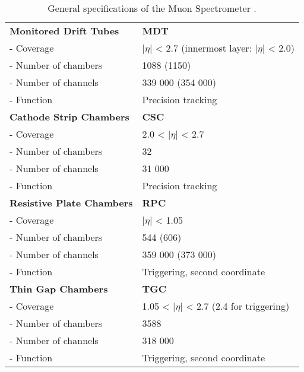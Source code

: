 \begin{table}[] \centering
\caption{General specifications of the Muon Spectrometer \cite{atlas_tdr}.}
\label{tab:muon_specs}
\begin{tabular}{|l|l|}
\hline
\textbf{Monitored Drift Tubes}    & \textbf{MDT}                                                      \\
- Coverage               & $|\eta|$ < 2.7 (innermost layer: $|\eta|$ < 2.0)         \\
- Number of chambers     & 1088 (1150)                                              \\
- Number of channels     & 339 000 (354 000)                                        \\
- Function               & Precision tracking                                       \\
\hline
\textbf{Cathode Strip Chambers}   & \textbf{CSC}                                                      \\
- Coverage               & 2.0 < $|\eta|$ < 2.7                                     \\
- Number of chambers     & 32                                                       \\
- Number of channels     & 31 000                                                   \\
- Function               & Precision tracking                                       \\
\hline
\textbf{Resistive Plate Chambers} & \textbf{RPC}                                                      \\
- Coverage               & $|\eta|$ < 1.05                                          \\
- Number of chambers     & 544 (606)                                                \\
- Number of channels     & 359 000 (373 000)                                        \\
- Function               & Triggering, second coordinate                            \\
\hline
\textbf{Thin Gap Chambers}        & \textbf{TGC}                                                      \\
- Coverage               & 1.05 < $|\eta|$ < 2.7 (2.4 for triggering)               \\
- Number of chambers     & 3588                                                     \\
- Number of channels     & 318 000                                                  \\
- Function               & Triggering, second coordinate                            \\
\hline
\end{tabular} \end{table}
